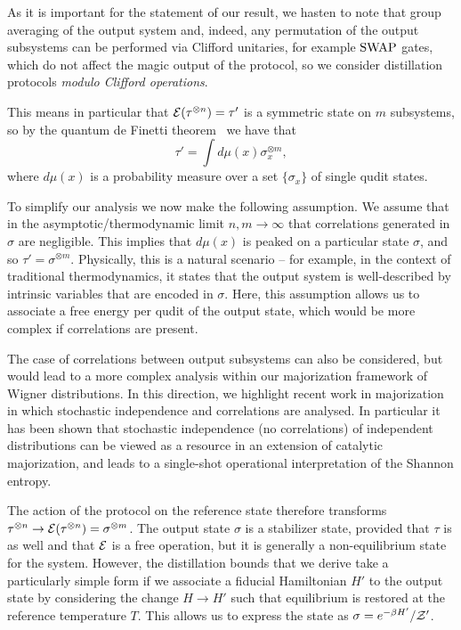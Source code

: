 \documentclass[pra,
aps,
twocolumn,
superscriptaddress,
groupedaddress,
nofootinbib,
reprint
]{revtex4-1}
\begin{document}
As it is important for the statement of our result, we hasten to note that group averaging of the output system and, indeed, any permutation of the output subsystems can be performed via Clifford unitaries, for example $\rm{SWAP}$ gates, which do not affect the magic output of the protocol, so we consider distillation protocols \emph{modulo Clifford operations}.

This means in particular that ${\mathcal E}(\tau^{\otimes n}) = \tau'$ is a symmetric state on $m$ subsystems, so by the quantum de Finetti theorem~\cite{christandl_2007} we have that
\begin{equation}
\tau'  = \int d\mu(x) \sigma_x^{\otimes m},
\end{equation}
where $d\mu(x)$ is a probability measure over a set $\{\sigma_x\}$ of single qudit states.

To simplify our analysis we now make the following assumption. We assume that in the asymptotic/thermodynamic limit $n,m \rightarrow \infty$ that correlations generated in $\sigma$ are negligible. This implies that $d\mu(x)$ is peaked on a particular state $\sigma$, and so $\tau' = \sigma^{\otimes m}$. Physically, this is a natural scenario -- for example, in the context of traditional thermodynamics, it states that the output system is well-described by intrinsic variables that are encoded in $\sigma$. Here, this assumption allows us to associate a free energy per qudit of the output state, which would be more complex if correlations are present.

The case of correlations between output subsystems can also be considered, but would lead to a more complex analysis within our majorization framework of Wigner distributions. In this direction, we highlight recent work in majorization in which stochastic independence and correlations are analysed. In particular it has been shown that stochastic independence (no correlations) of independent distributions can be viewed as a resource in an extension of catalytic majorization, and leads to a single-shot operational interpretation of the Shannon entropy. 

The action of the protocol on the reference state therefore transforms $\tau^{\otimes n} \rightarrow {\mathcal E}(\tau^{\otimes n}) = \sigma^{\otimes m}$. 
The output state $\sigma$ is a stabilizer state, provided that $\tau$ is as well and that ${\mathcal E}$ is a free operation, but it is generally a non-equilibrium state for the system. However, the distillation bounds that we derive take a particularly simple form if we associate a fiducial Hamiltonian $H'$ to the output state by considering the change $H \rightarrow H'$ such that equilibrium is restored at the reference temperature $T$. 
This allows us to express the state as $\sigma = e^{-\beta H'}/\mathcal{Z}'$.
\end{document}
